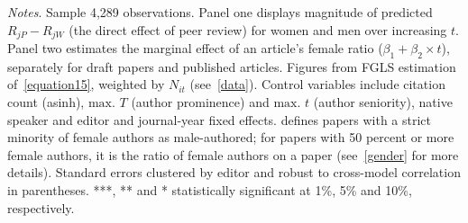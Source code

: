 \begin{table}
\begin{threeparttable}
\begin{tablenotes}
            \item \textit{Notes}. Sample 4,289 observations. Panel one displays magnitude of predicted \(R_{jP}-R_{jW}\) (the direct effect of peer review) for women and men over increasing \(t\). Panel two estimates the marginal effect of an article's female ratio (\(\beta_1+\beta_2\times t\)), separately for draft papers and published articles. Figures from FGLS estimation of~\autoref{equation15}, weighted by \(N_{it}\) (see~\autoref{data}). Control variables include citation count (asinh), \(\text{max. }T\) (author prominence) and \(\text{max. }t\) (author seniority), native speaker and editor and journal-year fixed effects. defines papers with a strict minority of female authors as male-authored; for papers with 50 percent or more female authors, it is the ratio of female authors on a paper (see~\autoref{gender} for more details). Standard errors clustered by editor and robust to cross-model correlation in parentheses. ***, ** and * statistically significant at 1\%, 5\% and 10\%, respectively.
        \end{tablenotes}
    \end{threeparttable}
\end{table}